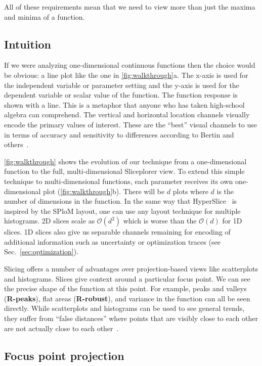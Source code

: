 All of
these requirements mean that we need to view more than just the maxima and
minima of a function.

\subsection{Intuition}

If we were analyzing one-dimensional continuous functions then the choice would
be obvious: a line plot like the one in \autoref{fig:walkthrough}a. The x-axis
is used for the independent variable or parameter setting and the y-axis is
used for the dependent variable or scalar value of the function. The function
response is shown with a line. This is a metaphor that anyone who has taken
high-school algebra can comprehend. The vertical and horizontal location
channels visually encode the primary values of interest. These are the ``best''
visual channels to use in terms of accuracy and sensitivity to differences
according to Bertin and others~\cite{Bertin:1967, Mackinlay:1986}. 

\autoref{fig:walkthrough} shows the evolution
of our technique from a one-dimensional function to the full, multi-dimensional
Sliceplorer view.
To extend this simple technique to multi-dimensional functions, each parameter
receives its own one-dimensional plot
(\autoref{fig:walkthrough}b). 
There will be \(d\) plots where \(d\) is
the number of dimensions in the function. In the same way that
HyperSlice~\cite{Wijk:1993} is inspired by the SPloM layout, one can use any
layout technique for multiple histograms. 2D slices scale as $\mathcal{O}(d^2)$
which is worse than the $\mathcal{O}(d)$ for 1D slices. 
1D slices also give us separable channels remaining for encoding of additional
information such as uncertainty or optimization traces (see
Sec.~\ref{sec:optimization}).

Slicing offers a number of advantages over projection-based views like
scatterplots and histograms. Slices give context around a particular focus
point. We can see the precise shape of the function at this point.  For
example, peaks and valleys (\textbf{R-peaks}), flat areas (\textbf{R-robust}),
and variance in the function can all be seen directly.  While scatterplots and
histograms can be used to see general trends, they suffer from ``false
distances'' where points that are visibly close to each other are not actually
close to each other~\cite{Wilkinson:2018}. 

\subsection{Focus point projection}

